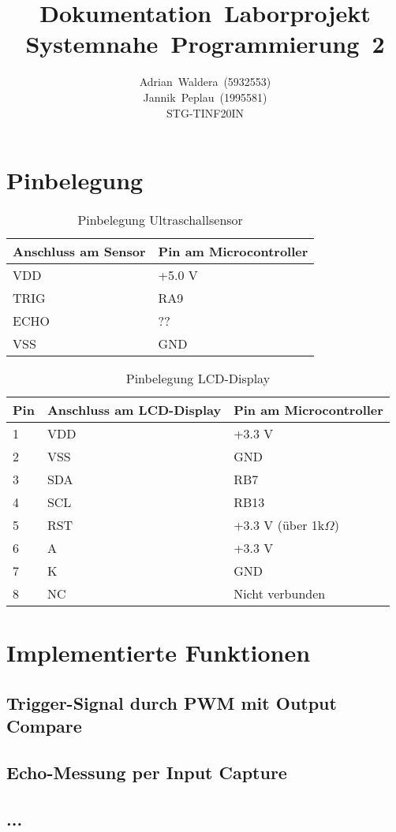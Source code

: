 \documentclass[german]{article}
\title{\textbf{Dokumentation~Laborprojekt\\Systemnahe~Programmierung~2}}
\author{
    Adrian~Waldera~(5932553) \\
    Jannik~Peplau~(1995581) \\
    STG-TINF20IN\\
}
\begin{document}
\maketitle

\section{Pinbelegung}

\begin{table}[H]\centering\begin{tabular}{|l|l|}
\hline
Anschluss am Sensor & Pin am Microcontroller\\\hline
VDD & +5.0 V\\\hline
TRIG & RA9\\\hline
ECHO & ??\\\hline
VSS & GND\\\hline
\end{tabular}\caption{Pinbelegung Ultraschallsensor}\end{table}\label{tab-pinsus}

\begin{table}[H]\centering\begin{tabular}{|l|l|l|}
\hline
Pin & Anschluss am LCD-Display & Pin am Microcontroller\\\hline
1 & VDD & +3.3 V\\\hline
2 & VSS & GND\\\hline
3 & SDA & RB7\\\hline
4 & SCL & RB13\\\hline
5 & RST & +3.3 V (über 1k$\Omega$)\\\hline
6 & A & +3.3 V\\\hline
7 & K & GND \\\hline
8 & NC & Nicht verbunden\\\hline
\end{tabular}\caption{Pinbelegung LCD-Display}\end{table}\label{tab-pinsdp}

\section{Implementierte Funktionen}
\subsection{Trigger-Signal durch PWM mit Output Compare}

\subsection{Echo-Messung per Input Capture}

\subsection{...}
\end{document}
